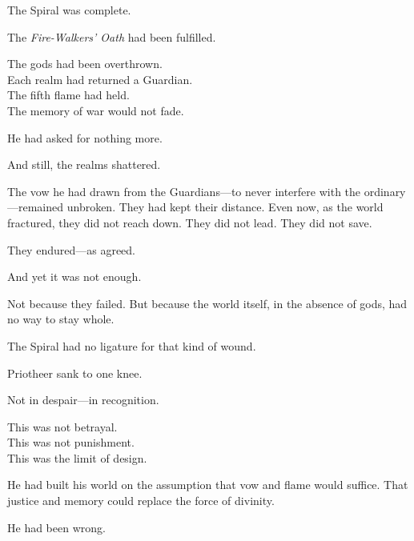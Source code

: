 \documentclass[12pt]{article}
\begin{document}
\vspace{0.5em}
The Spiral was complete.

\vspace{0.5em}
The \textit{Fire-Walkers’ Oath} had been fulfilled.

\vspace{0.5em}
The gods had been overthrown.\\
Each realm had returned a Guardian.\\
The fifth flame had held.\\
The memory of war would not fade.

\vspace{0.5em}
He had asked for nothing more.

\vspace{0.5em}
And still, the realms shattered.

\vspace{0.5em}
The vow he had drawn from the Guardians---to never interfere with the ordinary---remained unbroken. They had kept their distance. Even now, as the world fractured, they did not reach down. They did not lead. They did not save.

\vspace{0.5em}
They endured---as agreed.

\vspace{0.5em}
And yet it was not enough.

\vspace{0.5em}
Not because they failed. But because the world itself, in the absence of gods, had no way to stay whole.

\vspace{0.5em}
The Spiral had no ligature for that kind of wound.

\vspace{0.5em}
Priotheer sank to one knee.

\vspace{0.5em}
Not in despair---in recognition.

\vspace{0.5em}
This was not betrayal.\\
This was not punishment.\\
This was the limit of design.

\vspace{0.5em}
He had built his world on the assumption that vow and flame would suffice. That justice and memory could replace the force of divinity.

\vspace{0.5em}
He had been wrong.
\end{document}
